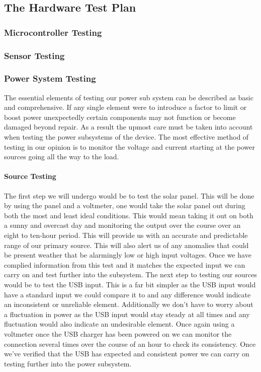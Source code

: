 \subsection{The Hardware Test Plan}
\subsubsection{Microcontroller Testing}
\subsubsection{Sensor Testing}
\subsubsection{Power System Testing}
The essential elements of testing our power sub system can be described as basic and comprehensive. If any single element were to introduce a factor to limit or boost power unexpectedly certain components may not function or become damaged beyond repair. As a result the upmost care must be taken into account when testing the power subsystems of the device. The most effective method of testing in our opinion is to monitor the voltage and current starting at the power sources going all the way to the load. 

\paragraph{Source Testing}
The first step we will undergo would be to test the solar panel. This will be done by using the panel and a voltmeter, one would take the solar panel out during both the most and least ideal conditions. This would mean taking it out on both a sunny and overcast day and monitoring the output over the course over an eight to ten-hour period. This will provide us with an accurate and predictable range of our primary source. This will also alert us of any anomalies that could be present weather that be alarmingly low or high input voltages. Once we have complied information from this test and it matches the expected input we can carry on and test further into the subsystem.
The next step to testing our sources would be to test the USB input. This is a far bit simpler as the USB input would have a standard input we could compare it to and any difference would indicate an inconsistent or unreliable element. Additionally we don't have to worry about a fluctuation in power as the USB input would stay steady at all times and any fluctuation would also indicate an undesirable element. Once again using a voltmeter once the USB charger has been powered on we can monitor the connection several times over the course of an hour to check its consistency. Once we've verified that the USB has expected and consistent power we can carry on testing further into the power subsystem.

